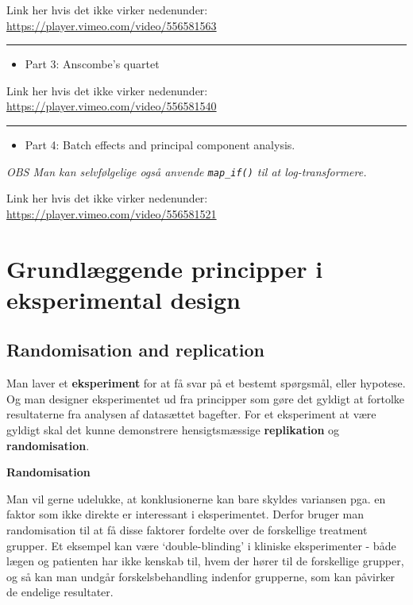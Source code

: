 \documentclass[
]{book}
\providecommand{\tightlist}{%
  \setlength{\itemsep}{0pt}\setlength{\parskip}{0pt}}
\begin{document}
Link her hvis det ikke virker nedenunder: \url{https://player.vimeo.com/video/556581563}

\begin{center}\rule{0.5\linewidth}{0.5pt}\end{center}

\begin{itemize}
\tightlist
\item
  Part 3: Anscombe's quartet
\end{itemize}

Link her hvis det ikke virker nedenunder: \url{https://player.vimeo.com/video/556581540}

\begin{center}\rule{0.5\linewidth}{0.5pt}\end{center}

\begin{itemize}
\tightlist
\item
  Part 4: Batch effects and principal component analysis.
\end{itemize}

\emph{OBS Man kan selvfølgelige også anvende \texttt{map\_if()} til at log-transformere.}

Link her hvis det ikke virker nedenunder: \url{https://player.vimeo.com/video/556581521}

\hypertarget{grundluxe6ggende-principper-i-eksperimental-design}{%
\section{Grundlæggende principper i eksperimental design}\label{grundluxe6ggende-principper-i-eksperimental-design}}

\hypertarget{randomisation-and-replication}{%
\subsection{Randomisation and replication}\label{randomisation-and-replication}}

Man laver et \textbf{eksperiment} for at få svar på et bestemt spørgsmål, eller hypotese. Og man designer eksperimentet ud fra principper som gøre det gyldigt at fortolke resultaterne fra analysen af datasættet bagefter. For et eksperiment at være gyldigt skal det kunne demonstrere hensigtsmæssige \textbf{replikation} og \textbf{randomisation}.

\textbf{Randomisation}

Man vil gerne udelukke, at konklusionerne kan bare skyldes variansen pga. en faktor som ikke direkte er interessant i eksperimentet. Derfor bruger man randomisation til at få disse faktorer fordelte over de forskellige treatment grupper. Et eksempel kan være `double-blinding' i kliniske eksperimenter - både lægen og patienten har ikke kenskab til, hvem der hører til de forskellige grupper, og så kan man undgår forskelsbehandling indenfor grupperne, som kan påvirker de endelige resultater.
\end{document}
